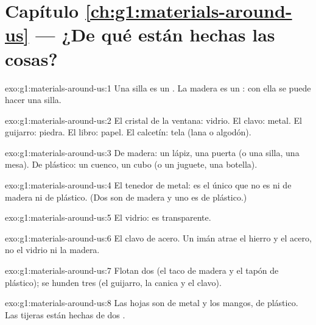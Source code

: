 \section*{Capítulo \ref{ch:g1:materials-around-us} --- ¿De qué están hechas las cosas?}

\begin{solution}{exo:g1:materials-around-us:1}
Una silla es un . La madera es un : con ella se puede
hacer una silla.
\end{solution}

\begin{solution}{exo:g1:materials-around-us:2}
El cristal de la ventana: vidrio. El clavo: metal. El guijarro: piedra.
El libro: papel. El calcetín: tela (lana o algodón).
\end{solution}

\begin{solution}{exo:g1:materials-around-us:3}
De madera: un lápiz, una puerta (o una silla, una mesa). De plástico:
un cuenco, un cubo (o un juguete, una botella).
\end{solution}

\begin{solution}{exo:g1:materials-around-us:4}
El tenedor de metal: es el único que no es ni de madera ni de plástico.
(Dos son de madera y uno es de plástico.)
\end{solution}

\begin{solution}{exo:g1:materials-around-us:5}
El vidrio: es transparente.
\end{solution}

\begin{solution}{exo:g1:materials-around-us:6}
El clavo de acero. Un imán atrae el hierro y el acero, no el vidrio ni
la madera.
\end{solution}

\begin{solution}{exo:g1:materials-around-us:7}
Flotan dos  (el taco de madera y el tapón de plástico); se
hunden tres (el guijarro, la canica y el clavo).
\end{solution}

\begin{solution}{exo:g1:materials-around-us:8}
Las hojas son de metal y los mangos, de plástico. Las tijeras están
hechas de dos .
\end{solution}

